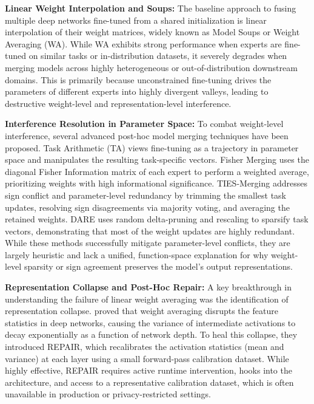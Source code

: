 \documentclass{article}
\theoremstyle{plain}
\theoremstyle{definition}
\theoremstyle{remark}
\begin{document}
\textbf{Linear Weight Interpolation and Soups:} The baseline approach to fusing multiple deep networks fine-tuned from a shared initialization is linear interpolation of their weight matrices, widely known as Model Soups \citep{wortsman2022model} or Weight Averaging (WA). While WA exhibits strong performance when experts are fine-tuned on similar tasks or in-distribution datasets, it severely degrades when merging models across highly heterogeneous or out-of-distribution downstream domains. This is primarily because unconstrained fine-tuning drives the parameters of different experts into highly divergent valleys, leading to destructive weight-level and representation-level interference.

\textbf{Interference Resolution in Parameter Space:} To combat weight-level interference, several advanced post-hoc model merging techniques have been proposed. Task Arithmetic (TA) \citep{ilharco2022editing} views fine-tuning as a trajectory in parameter space and manipulates the resulting task-specific vectors. Fisher Merging \citep{matena2022merging} uses the diagonal Fisher Information matrix of each expert to perform a weighted average, prioritizing weights with high informational significance. TIES-Merging \citep{yadav2023ties} addresses sign conflict and parameter-level redundancy by trimming the smallest task updates, resolving sign disagreements via majority voting, and averaging the retained weights. DARE \citep{yu2023language} uses random delta-pruning and rescaling to sparsify task vectors, demonstrating that most of the weight updates are highly redundant. While these methods successfully mitigate parameter-level conflicts, they are largely heuristic and lack a unified, function-space explanation for why weight-level sparsity or sign agreement preserves the model's output representations.

\textbf{Representation Collapse and Post-Hoc Repair:} A key breakthrough in understanding the failure of linear weight averaging was the identification of representation collapse. \citet{jordan2023repair} proved that weight averaging disrupts the feature statistics in deep networks, causing the variance of intermediate activations to decay exponentially as a function of network depth. To heal this collapse, they introduced REPAIR, which recalibrates the activation statistics (mean and variance) at each layer using a small forward-pass calibration dataset. While highly effective, REPAIR requires active runtime intervention, hooks into the architecture, and access to a representative calibration dataset, which is often unavailable in production or privacy-restricted settings.
\end{document}
